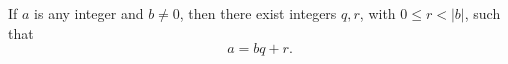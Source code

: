 If $a$ is any integer and $b \neq 0$, then there exist integers $q, r$, with $0 \leq r < |b|$, such that
$$a = bq + r.$$
